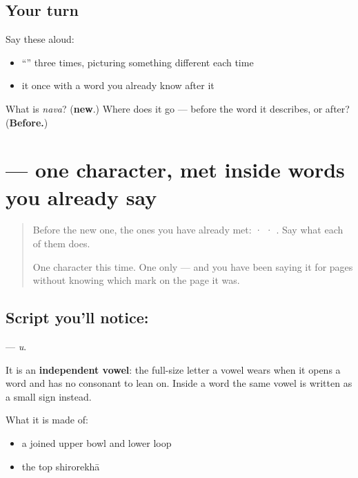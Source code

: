 \subsection*{Your turn}
Say these aloud:

\begin{itemize}
\raggedright
  \item \textquotedblleft{}\textquotedblright{} three times, picturing something different each time
  \item it once with a word you already know after it
\end{itemize}

\begin{tcolorbox}[breakable,colback=teal!4,colframe=teal!35!black,title={Before you move on}]
What is \emph{nava}? (\textbf{new}.) Where does it go — before the word it describes, or after? (\textbf{Before.})
\end{tcolorbox}
\section[\texorpdfstring{\sk{उ} (u)}{उ (u)}]{ — one character, met inside words you already say}

\label{lesson:SA-S121-letter-u}



\begin{quote}
Before the new one, the ones you have already met:  ·  · . Say what each of them does.

One character this time. One only — and you have been saying it for pages without knowing which mark on the page it was.
\end{quote}

\subsection*{Script you'll notice: }
\textbf{} — \emph{u}.

It is an \textbf{independent vowel}: the full-size letter a vowel wears when it opens a word and has no consonant to lean on. Inside a word the same vowel is written as a small sign instead.

What it is made of:

\begin{itemize}
\raggedright
  \item a joined upper bowl and lower loop
  \item the top shirorekhā
\end{itemize}

